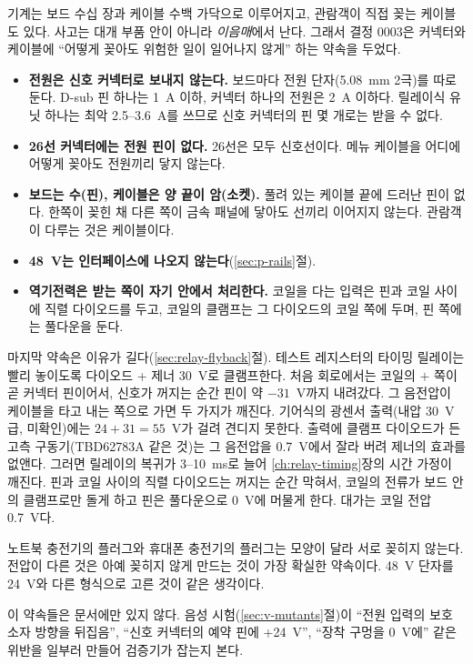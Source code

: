 \Why 기계는 보드 수십 장과 케이블 수백 가닥으로 이루어지고, 관람객이 직접 꽂는 케이블도 있다. 사고는 대개 부품 안이 아니라
\emph{이음매}에서 난다. 그래서 결정 0003은 커넥터와 케이블에 ``어떻게 꽂아도 위험한 일이 일어나지 않게'' 하는 약속을 두었다.
\begin{itemize}
\item \textbf{전원은 신호 커넥터로 보내지 않는다.} 보드마다 전원 단자(5.08~mm 2극)를 따로 둔다. D-sub 핀 하나는 1~A 이하,
커넥터 하나의 전원은 2~A 이하다. 릴레이식 유닛 하나는 최악 2.5--3.6~A를 쓰므로 신호 커넥터의 핀 몇 개로는 받을 수 없다.
\item \textbf{26선 커넥터에는 전원 핀이 없다.} 26선은 모두 신호선이다. 메뉴 케이블을 어디에 어떻게 꽂아도 전원끼리 닿지
않는다.
\item \textbf{보드는 수(핀), 케이블은 양 끝이 암(소켓).} 풀려 있는 케이블 끝에 드러난 핀이 없다. 한쪽이 꽂힌 채 다른 쪽이
금속 패널에 닿아도 선끼리 이어지지 않는다. 관람객이 다루는 것은 케이블이다.
\item \textbf{48~V는 인터페이스에 나오지 않는다}(\ref{sec:p-rails}절).
\item \textbf{역기전력은 받는 쪽이 자기 안에서 처리한다.} 코일을 다는 입력은 핀과 코일 사이에 직렬 다이오드를 두고, 코일의
클램프는 그 다이오드의 코일 쪽에 두며, 핀 쪽에는 풀다운을 둔다.
\end{itemize}

마지막 약속은 이유가 길다(\ref{sec:relay-flyback}절). 테스트 레지스터의 타이밍 릴레이는 빨리 놓이도록 다이오드 + 제너 30~V로
클램프한다. 처음 회로에서는 코일의 $+$ 쪽이 곧 커넥터 핀이어서, 신호가 꺼지는 순간 핀이 약 $-31$~V까지 내려갔다. 그 음전압이
케이블을 타고 내는 쪽으로 가면 두 가지가 깨진다. 기어식의 광센서 출력(내압 30~V급, 미확인)에는 $24 + 31 = 55$~V가 걸려 견디지
못한다. 출력에 클램프 다이오드가 든 고측 구동기(TBD62783A 같은 것)는 그 음전압을 0.7~V에서 잘라 버려 제너의 효과를 없앤다.
그러면 릴레이의 복귀가 3--10~ms로 늘어 \ref{ch:relay-timing}장의 시간 가정이 깨진다. 핀과 코일 사이의 직렬 다이오드는 꺼지는
순간 막혀서, 코일의 전류가 보드 안의 클램프로만 돌게 하고 핀은 풀다운으로 0~V에 머물게 한다. 대가는 코일 전압 0.7~V다.

\General 노트북 충전기의 플러그와 휴대폰 충전기의 플러그는 모양이 달라 서로 꽂히지 않는다. 전압이 다른 것은 아예 꽂히지
않게 만드는 것이 가장 확실한 약속이다. 48~V 단자를 24~V와 다른 형식으로 고른 것이 같은 생각이다.

\Ours 이 약속들은 문서에만 있지 않다. 음성 시험(\ref{sec:v-mutants}절)이 ``전원 입력의 보호 소자 방향을 뒤집음'', ``신호
커넥터의 예약 핀에 +24~V'', ``장착 구멍을 0~V에'' 같은 위반을 일부러 만들어 검증기가 잡는지 본다.

